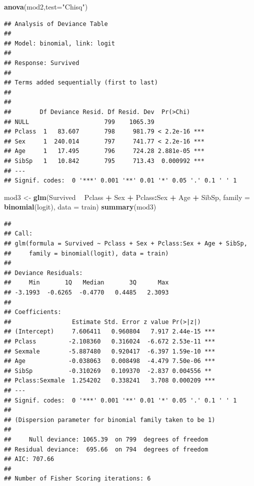 \documentclass[]{book}
\newenvironment{Shaded}{\begin{snugshade}}{\end{snugshade}}
\newcommand{\KeywordTok}[1]{\textcolor[rgb]{0.13,0.29,0.53}{\textbf{#1}}}
\newcommand{\DataTypeTok}[1]{\textcolor[rgb]{0.13,0.29,0.53}{#1}}
\newcommand{\StringTok}[1]{\textcolor[rgb]{0.31,0.60,0.02}{#1}}
\newcommand{\OperatorTok}[1]{\textcolor[rgb]{0.81,0.36,0.00}{\textbf{#1}}}
\newcommand{\NormalTok}[1]{#1}
\begin{document}
\begin{Shaded}
\begin{Highlighting}[]
\KeywordTok{anova}\NormalTok{(mod2,}\DataTypeTok{test=}\StringTok{"Chisq"}\NormalTok{)}
\end{Highlighting}
\end{Shaded}

\begin{verbatim}
## Analysis of Deviance Table
## 
## Model: binomial, link: logit
## 
## Response: Survived
## 
## Terms added sequentially (first to last)
## 
## 
##        Df Deviance Resid. Df Resid. Dev  Pr(>Chi)    
## NULL                     799    1065.39              
## Pclass  1   83.607       798     981.79 < 2.2e-16 ***
## Sex     1  240.014       797     741.77 < 2.2e-16 ***
## Age     1   17.495       796     724.28 2.881e-05 ***
## SibSp   1   10.842       795     713.43  0.000992 ***
## ---
## Signif. codes:  0 '***' 0.001 '**' 0.01 '*' 0.05 '.' 0.1 ' ' 1
\end{verbatim}

\begin{Shaded}
\begin{Highlighting}[]
\NormalTok{mod3 <-}\StringTok{  }\KeywordTok{glm}\NormalTok{(Survived }\OperatorTok{~}\StringTok{ }\NormalTok{Pclass }\OperatorTok{+}\StringTok{ }\NormalTok{Sex }\OperatorTok{+}\StringTok{ }\NormalTok{Pclass}\OperatorTok{:}\NormalTok{Sex }\OperatorTok{+}\StringTok{ }\NormalTok{Age }\OperatorTok{+}\StringTok{ }\NormalTok{SibSp, }\DataTypeTok{family =} \KeywordTok{binomial}\NormalTok{(logit), }\DataTypeTok{data =}\NormalTok{ train)}
\KeywordTok{summary}\NormalTok{(mod3)}
\end{Highlighting}
\end{Shaded}

\begin{verbatim}
## 
## Call:
## glm(formula = Survived ~ Pclass + Sex + Pclass:Sex + Age + SibSp, 
##     family = binomial(logit), data = train)
## 
## Deviance Residuals: 
##     Min       1Q   Median       3Q      Max  
## -3.1993  -0.6265  -0.4770   0.4485   2.3093  
## 
## Coefficients:
##                 Estimate Std. Error z value Pr(>|z|)    
## (Intercept)     7.606411   0.960804   7.917 2.44e-15 ***
## Pclass         -2.108360   0.316024  -6.672 2.53e-11 ***
## Sexmale        -5.887480   0.920417  -6.397 1.59e-10 ***
## Age            -0.038063   0.008498  -4.479 7.50e-06 ***
## SibSp          -0.310269   0.109370  -2.837 0.004556 ** 
## Pclass:Sexmale  1.254202   0.338241   3.708 0.000209 ***
## ---
## Signif. codes:  0 '***' 0.001 '**' 0.01 '*' 0.05 '.' 0.1 ' ' 1
## 
## (Dispersion parameter for binomial family taken to be 1)
## 
##     Null deviance: 1065.39  on 799  degrees of freedom
## Residual deviance:  695.66  on 794  degrees of freedom
## AIC: 707.66
## 
## Number of Fisher Scoring iterations: 6
\end{verbatim}
\end{document}
